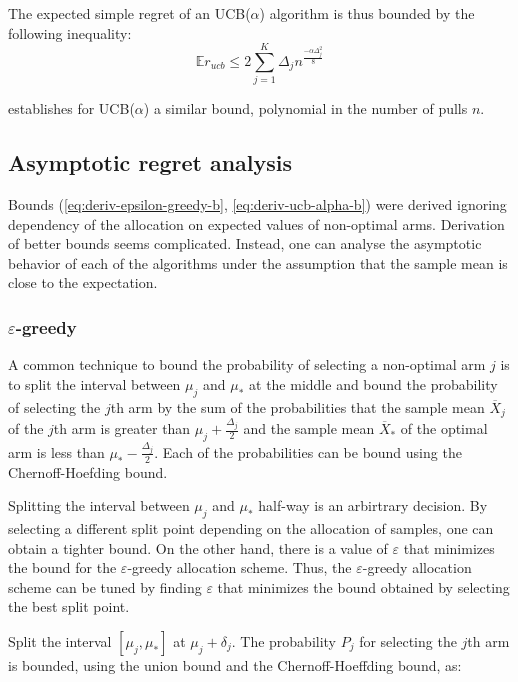 \documentclass{article}
\newcommand {\IE} {\ensuremath {\mathbb{E}}}
\begin{document}
The expected simple regret of an UCB($\alpha$) algorithm is thus
bounded by the following inequality:
\begin{equation}
\IE r_{ucb} \le 2\sum_{j=1}^K \Delta_jn^{\frac {-\alpha \Delta_j^2} 8}
\label{eq:deriv-ucb-alpha-b}
\end{equation}

\cite{Bubeck.pure} establishes for UCB($\alpha$) a similar bound,
polynomial in the number of pulls $n$.

\subsection{Asymptotic regret analysis}
\label{app:derivations-asym}


Bounds (\ref{eq:deriv-epsilon-greedy-b}, \ref{eq:deriv-ucb-alpha-b}) were
derived ignoring dependency of the allocation on expected values
of non-optimal arms. Derivation of better bounds seems
complicated. Instead, one can analyse the asymptotic behavior of each of the
algorithms under the assumption that the sample mean is close to the expectation.

\subsubsection{$\varepsilon$-greedy}
\label{app:derivations-asym-eps}


A common technique \cite{Auer.ucb} to bound the probability of
selecting a non-optimal arm $j$ is to split the interval between
$\mu_j$ and $\mu_*$ at the middle and bound the probability of
selecting the $j$th arm by the sum of the probabilities that the sample
mean $\overline X_j$ of the $j$th arm is greater than $\mu_j+\frac
{\Delta_j} 2$ and the sample mean $\overline X_*$ of the optimal arm is
less than $\mu_*- \frac {\Delta_j} 2$. Each of the probabilities can
be bound using the Chernoff-Hoefding bound.

Splitting the interval between $\mu_j$ and $\mu_*$ half-way is an
arbirtrary decision. By selecting a different split point
depending on the allocation of samples, one can obtain a tighter
bound. On the other hand, there is a value of $\varepsilon$ that
minimizes the bound for the $\varepsilon$-greedy allocation scheme.
Thus, the  $\varepsilon$-greedy allocation scheme can be tuned by
finding $\varepsilon$ that minimizes the bound obtained by
selecting the best split point. 

Split the interval $[\mu_j, \mu_*]$ at $\mu_j+\delta_j$. The
probability $P_j$ for selecting the
$j$th arm is bounded, using the union bound and the Chernoff-Hoeffding bound, as:
\end{document}
